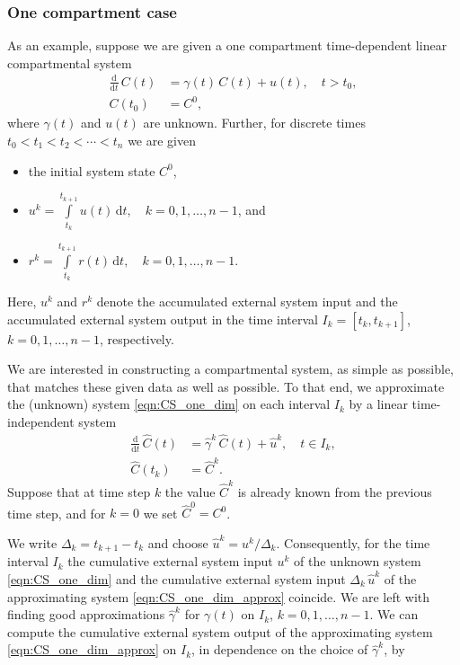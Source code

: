 \documentclass[11pt,a4paper]{article}
\newcommand{\deriv}[1]{\frac{\mathrm{d}}{\mathrm{d}#1}}
\newcommand{\dd}[1]{\,\mathrm{d}#1}
\newcommand{\intl}{\int\limits}
\begin{document}
    \subsubsection{One compartment case}
        As an example, suppose we are given a one compartment time-dependent linear compartmental system
        \begin{equation}\label{eqn:CS_one_dim}
            \begin{aligned}
                \deriv{t}\,C(t) &= \gamma(t)\,C(t) + u(t),\quad t>t_0,\\
                C(t_0) &= C^0,
            \end{aligned}
        \end{equation}
        where $\gamma(t)$ and $u(t)$ are unknown.
        Further, for discrete times $t_0<t_1<t_2<\cdots<t_n$ we are given
        \begin{itemize}
            \item the initial system state $C^0$,
            \item $u^k = \intl_{t_k}^{t_{k+1}} u(t)\dd{t},\quad k=0,1,\ldots,n-1$, and
            \item $r^k = \intl_{t_k}^{t_{k+1}} r(t)\dd{t},\quad k=0,1,\ldots,n-1$.
        \end{itemize}
        Here, $u^k$ and $r^k$ denote the accumulated external system input and the accumulated external system output in the time interval $I_k=[t_k,t_{k+1}]$, $k=0,1,\ldots,n-1$, respectively.

        We are interested in constructing a compartmental system, as simple as possible, that matches these given data as well as possible.
        To that end, we approximate the (unknown) system \eqref{eqn:CS_one_dim} on each interval $I_k$ by a linear time-independent system
        \begin{equation}\label{eqn:CS_one_dim_approx}
            \begin{aligned}
                \deriv{t}\,\widehat{C}(t) &= \widehat{\gamma}^k\,\widehat{C}(t) + \widehat{u}^k,\quad t\in I_k,\\
                \widehat{C}(t_k) &= \widehat{C}^k.
            \end{aligned}
        \end{equation}
        Suppose that at time step $k$ the value $\widehat{C}^k$ is already known from the previous time step,
        and for $k=0$ we set $\widehat{C}^0=C^0$.
        
        We write $\Delta_k=t_{k+1}-t_k$ and choose $\widehat{u}^k=u^k/\Delta_k$.
        Consequently, for the time interval $I_k$ the cumulative external system input $u^k$ of the unknown system \eqref{eqn:CS_one_dim} and the cumulative external system input $\Delta_k\,\widehat{u}^k$ of the approximating system \eqref{eqn:CS_one_dim_approx} coincide.
        We are left with finding good approximations $\widehat{\gamma}^k$ for $\gamma(t)$ on $I_k$, $k=0,1,\ldots,n-1$.
        We can compute the cumulative external system output of the approximating system \eqref{eqn:CS_one_dim_approx} on $I_k$, in dependence on the choice of $\widehat{\gamma}^k$, by
        
\end{document}
